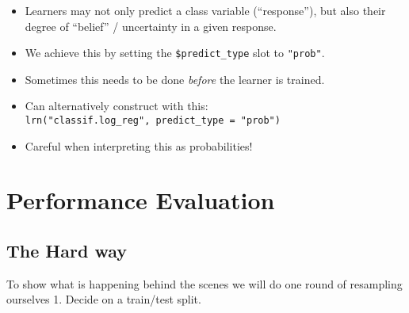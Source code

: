 \documentclass[]{article}
\newenvironment{Shaded}{\begin{snugshade}}{\end{snugshade}}
\newcommand{\CommentTok}[1]{\textcolor[rgb]{0.56,0.35,0.01}{\textit{#1}}}
\newcommand{\KeywordTok}[1]{\textcolor[rgb]{0.13,0.29,0.53}{\textbf{#1}}}
\newcommand{\NormalTok}[1]{#1}
\newcommand{\OperatorTok}[1]{\textcolor[rgb]{0.81,0.36,0.00}{\textbf{#1}}}
\newcommand{\StringTok}[1]{\textcolor[rgb]{0.31,0.60,0.02}{#1}}
\providecommand{\tightlist}{%
  \setlength{\itemsep}{0pt}\setlength{\parskip}{0pt}}
\begin{document}
\begin{itemize}
\tightlist
\item
  Learners may not only predict a class variable (``response''), but
  also their degree of ``belief'' / uncertainty in a given response.
\item
  We achieve this by setting the \texttt{\$predict\_type} slot to
  \texttt{"prob"}.
\item
  Sometimes this needs to be done \emph{before} the learner is trained.
\item
  Can alternatively construct with this:
  \texttt{lrn("classif.log\_reg",\ predict\_type\ =\ "prob")}
\end{itemize}

\begin{Shaded}
\end{Shaded}

\begin{Shaded}
\end{Shaded}

\begin{itemize}
\tightlist
\item
  Careful when interpreting this as probabilities!
\end{itemize}

\hypertarget{performance-evaluation}{%
\section{Performance Evaluation}\label{performance-evaluation}}

\hypertarget{the-hard-way}{%
\subsection{The Hard way}\label{the-hard-way}}

To show what is happening behind the scenes we will do one round of
resampling ourselves 1. Decide on a train/test split.
\end{document}
